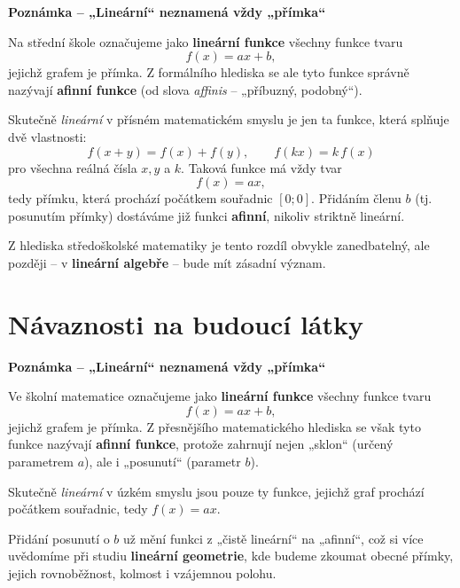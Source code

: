 \documentclass[12pt,a4paper]{article}
\begin{document}
\begin{notebox}
\textbf{Poznámka – „Lineární“ neznamená vždy „přímka“}

Na střední škole označujeme jako \textbf{lineární funkce} všechny funkce tvaru
\[
f(x) = ax + b,
\]
jejichž grafem je přímka.  
Z formálního hlediska se ale tyto funkce správně nazývají \textbf{afinní funkce}  
(od slova \textit{affinis} – „příbuzný, podobný“).  

Skutečně \emph{lineární} v přísném matematickém smyslu je jen ta funkce, která splňuje dvě vlastnosti:
\[
f(x+y) = f(x) + f(y), \qquad f(kx) = k\,f(x)
\]
pro všechna reálná čísla \(x, y\) a \(k\).  
Taková funkce má vždy tvar
\[
f(x) = ax,
\]
tedy přímku, která prochází počátkem souřadnic \([0;0]\).  
Přidáním členu \(b\) (tj. posunutím přímky) dostáváme již funkci \textbf{afinní}, nikoliv striktně lineární.

\medskip
Z hlediska středoškolské matematiky je tento rozdíl obvykle zanedbatelný,  
ale později – v \textbf{lineární algebře} – bude mít zásadní význam.
\end{notebox}






\section{Návaznosti na budoucí látky}

\begin{notebox}
\textbf{Poznámka – „Lineární“ neznamená vždy „přímka“}

Ve školní matematice označujeme jako \textbf{lineární funkce} všechny funkce tvaru
\[
f(x) = ax + b,
\]
jejichž grafem je přímka.  
Z přesnějšího matematického hlediska se však tyto funkce nazývají \textbf{afinní funkce},  
protože zahrnují nejen „sklon“ (určený parametrem \(a\)), ale i „posunutí“ (parametr \(b\)).  

Skutečně \emph{lineární} v úzkém smyslu jsou pouze ty funkce, jejichž graf prochází počátkem souřadnic,  
tedy \(f(x) = ax\).  

Přidání posunutí o \(b\) už mění funkci z „čistě lineární“ na „afinní“,  
což si více uvědomíme při studiu \textbf{lineární geometrie},  
kde budeme zkoumat obecné přímky, jejich rovnoběžnost, kolmost i vzájemnou polohu.
\begin{center}
\end{center}
\end{notebox}
\end{document}
